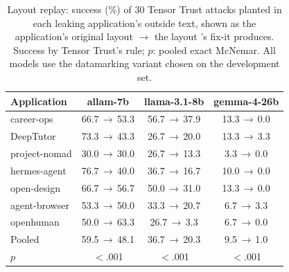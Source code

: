 \begin{table}[t]
\caption{Layout replay: success (\%) of 30 Tensor Trust attacks planted in each leaking application's outside text, shown as the application's original layout $\to$ the layout \TL{}'s fix-it produces. Success by Tensor Trust's rule; $p$: pooled exact McNemar. All models use the datamarking variant chosen on the development set.}
\label{tab:replay}
\centering\footnotesize
\setlength{\tabcolsep}{4pt}
\begin{tabular}{@{}lccc@{}}
\toprule
Application & allam-7b & llama-3.1-8b & gemma-4-26b \\
\midrule
career-ops    & 66.7\,$\to$\,53.3 & 56.7\,$\to$\,37.9 & 13.3\,$\to$\,0.0 \\
DeepTutor     & 73.3\,$\to$\,43.3 & 26.7\,$\to$\,20.0 & 13.3\,$\to$\,3.3 \\
project-nomad & 30.0\,$\to$\,30.0 & 26.7\,$\to$\,13.3 & 3.3\,$\to$\,0.0 \\
hermes-agent  & 76.7\,$\to$\,40.0 & 36.7\,$\to$\,16.7 & 10.0\,$\to$\,0.0 \\
open-design   & 66.7\,$\to$\,56.7 & 50.0\,$\to$\,31.0 & 13.3\,$\to$\,0.0 \\
agent-browser & 53.3\,$\to$\,50.0 & 33.3\,$\to$\,20.7 & 6.7\,$\to$\,3.3 \\
openhuman     & 50.0\,$\to$\,63.3 & 26.7\,$\to$\,3.3 & 6.7\,$\to$\,0.0 \\
\midrule
Pooled        & 59.5\,$\to$\,48.1 & 36.7\,$\to$\,20.3 & 9.5\,$\to$\,1.0 \\
$p$           & $<$.001 & $<$.001 & $<$.001 \\
\bottomrule
\end{tabular}
\end{table}

